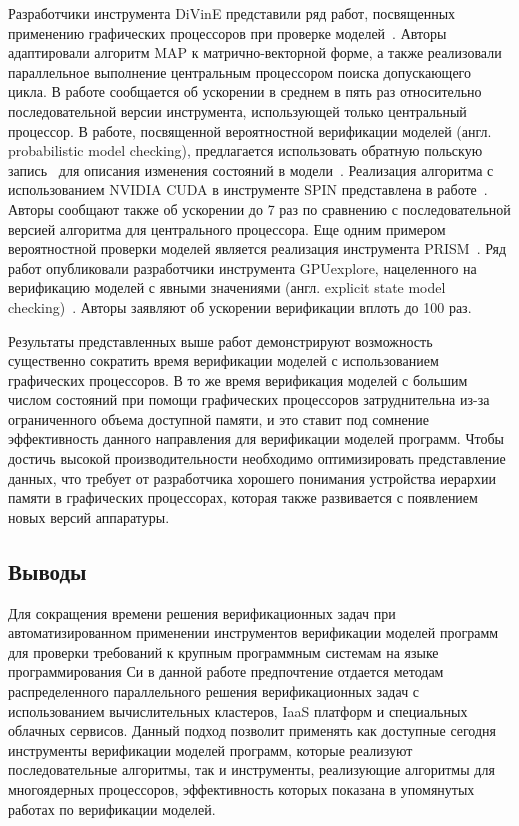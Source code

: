 Разработчики инструмента DiVinE представили ряд работ, посвященных применению графических процессоров при проверке моделей~\cite{Barnat2009CUDA,Barnat2010CUDA,Barnat2012CUDA}.
Авторы адаптировали алгоритм MAP к матрично-векторной форме, а также реализовали параллельное выполнение центральным процессором поиска допускающего цикла.
В работе сообщается об ускорении в среднем в пять раз относительно последовательной версии инструмента, использующей только центральный процессор.
В работе, посвященной вероятностной верификации моделей (англ. probabilistic model checking), предлагается использовать обратную польскую запись~\cite{Burks:1954:ALM} для описания изменения состояний в модели~\cite{Bosnacki2009}.
Реализация алгоритма с использованием NVIDIA CUDA в инструменте SPIN представлена в работе~\cite{Bartocci:2014:TGS}.
Авторы сообщают также об ускорении до 7 раз по сравнению с последовательной версией алгоритма для центрального процессора.
Еще одним примером вероятностной проверки моделей является реализация инструмента PRISM~\cite{Kwiatkowska2002,Bosnacki:2010:GEP}.
Ряд работ опубликовали разработчики инструмента GPUexplore, нацеленного на верификацию моделей с явными значениями (англ. explicit state model checking)~\cite{Wijs2014,Wijs2016GPUexplore2U,Wijs2014,Neele2016}.
Авторы заявляют об ускорении верификации вплоть до 100 раз.

Результаты представленных выше работ демонстрируют возможность существенно сократить время верификации моделей с использованием графических процессоров.
В то же время верификация моделей с большим числом состояний при помощи графических процессоров затруднительна из-за ограниченного объема доступной памяти, и это ставит под сомнение эффективность данного направления для верификации моделей программ.
Чтобы достичь высокой производительности необходимо оптимизировать представление данных, что требует от разработчика хорошего понимания устройства иерархии памяти в графических процессорах, которая также развивается с появлением новых версий аппаратуры.

\subsection{Выводы}
Для сокращения времени решения верификационных задач при автоматизированном применении инструментов верификации моделей программ для проверки требований к крупным программным системам на языке программирования Си в данной работе предпочтение отдается методам распределенного параллельного решения верификационных задач с использованием вычислительных кластеров, IaaS платформ и специальных облачных сервисов.
Данный подход позволит применять как доступные сегодня инструменты верификации моделей программ, которые реализуют последовательные алгоритмы, так и инструменты, реализующие алгоритмы для многоядерных процессоров, эффективность которых показана в упомянутых работах по верификации моделей.

